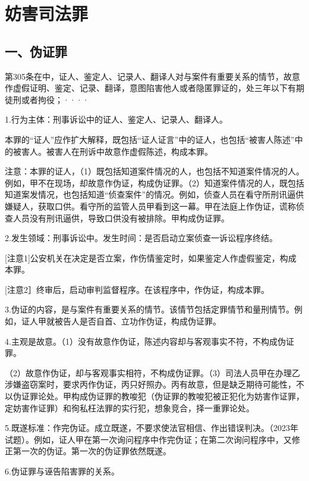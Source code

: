 \section{妨害司法罪}

\subsection*{一、伪证罪}

第305条在中，证人、鉴定人、记录人、翻译人对与案件有重要关系的情节，故意作虚假证明、鉴定、记录、翻译，意图陷害他人或者隐匿罪证的，处三年以下有期徒刑或者拘役；····

1.行为主体：刑事诉讼中的证人、鉴定人、记录人、翻译人。

本罪的“证人”应作扩大解释，既包括“证人证言”中的证人，也包括“被害人陈述”中的被害人。被害人在刑诉中故意作虚假陈述，构成本罪。

注意：本罪的证人，（1）既包括知道案件情况的人，也包括不知道案件情况的人。例如，甲不在现场，却故意作伪证，构成伪证罪。（2）知道案件情况的人，既包括知道案发情况，也包括知道“侦查案件”的情况。例如，侦查人员在看守所刑讯逼供嫌疑人，获取口供。看守所的监管人员甲看到这一幕。甲在法庭上作伪证，谎称侦查人员没有刑讯逼供，导致口供没有被排除。甲构成伪证罪。

2.发生领域：刑事诉讼中。发生时间：是否启动立案侦查一诉讼程序终结。

[注意1]公安机关在决定是否立案，作伤情鉴定时，如果鉴定人作虚假鉴定，构成本罪。

[注意2］终审后，启动审判监督程序。在该程序中，作伪证，构成本罪。

3.伪证的内容，是与案件有重要关系的情节。该情节包括定罪情节和量刑情节。例如，证人甲就被告人是否自首、立功作伪证，构成伪证罪。

4.主观是故意。（1）没有故意作伪证，陈述内容却与客观事实不符，不构成伪证罪。

（2）故意作伪证，却与客观事实相符，不构成伪证罪。（3）司法人员甲在办理乙涉嫌盗窃案时，要求丙作伪证，丙只好照办。丙有故意，但是缺乏期待可能性，不以伪证罪论处。甲构成伪证罪的教唆犯（伪证罪的教唆犯被正犯化为妨害作证罪，定妨害作证罪）和徇私枉法罪的实行犯，想象竞合，择一重罪论处。

5.既遂标准：作完伪证。成立既遂，不要求使法官相信、作出错误判决。（2023年试题）。例如，证人甲在第一次询问程序中作完伪证；在第二次询问程序中，又修正第一次的伪证。第一次的伪证罪依然既遂。

6.伪证罪与诬告陷害罪的关系。

